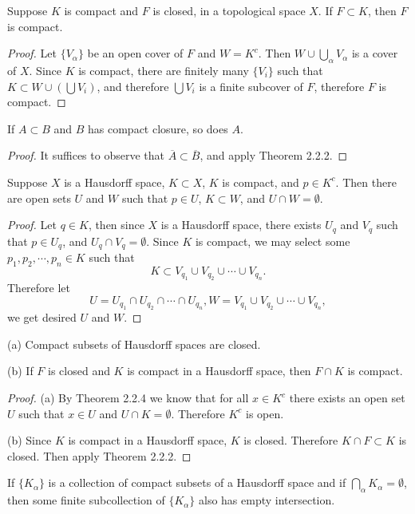 \begin{theorem}
Suppose $K$ is compact and $F$ is closed, in a topological space $X$. If $F\subset K$, then $F$ is compact.
\end{theorem}
\begin{proof}
Let $\{V_\alpha\}$ be an open cover of $F$ and $W=K^c$. Then $W\cup\bigcup_{\alpha}V_\alpha$ is a cover of $X$. Since $K$ is compact, there are finitely many $\{V_i\}$ such that $K\subset W\cup \left( \bigcup{V_i} \right) $, and therefore $\bigcup V_i$ is a finite subcover of $F$, therefore $F$ is compact.
\end{proof}
\begin{corollary}
If $A\subset B$ and $B$ has compact closure, so does $A$.
\end{corollary}
\begin{proof}
It suffices to observe that $\overline{A}\subset\overline{B}$, and apply Theorem 2.2.2.
\end{proof}
\begin{theorem}
Suppose $X$ is a Hausdorff space, $K\subset X$, $K$ is compact, and $p\in K^c$. Then there are open sets $U$ and $W$ such that $p\in U$, $K\subset W$, and $U\cap W=\emptyset$.
\end{theorem}
\begin{proof}
Let $q\in K$, then since $X$ is a Hausdorff space, there exists $U_q$ and $V_q$ such that $p\in U_q$, and $U_q\cap V_q=\emptyset$. Since $K$ is compact, we may select some $p_1,p_2,\cdots,p_n\in K$ such that 
$$K\subset V_{q_1}\cup V_{q_2}\cup\cdots\cup V_{q_n}.$$
Therefore let 
$$U=U_{q_1}\cap U_{q_2}\cap\cdots\cap U_{q_n},W=V_{q_1}\cup V_{q_2}\cup\cdots\cup V_{q_n},$$
we get desired $U$ and $W$.
\end{proof}
\begin{corollary}
(a) Compact subsets of Hausdorff spaces are closed.\par
(b) If $F$ is closed and $K$ is compact in a Hausdorff space, then $F\cap K$ is compact.
\end{corollary}
\begin{proof}
(a) By Theorem 2.2.4 we know that for all $x\in K^c$ there exists an open set $U$ such that $x\in U$ and $U\cap K=\emptyset$. Therefore $K^c$ is open.\par
(b) Since $K$ is compact in a Hausdorff space, $K$ is closed. Therefore $K\cap F\subset K$ is closed. Then apply Theorem 2.2.2.
\end{proof}
\begin{theorem}
If $\{K_\alpha\}$ is a collection of compact subsets of a Hausdorff space and if $\bigcap_\alpha K_\alpha=\emptyset$, then some finite subcollection of $\{K_\alpha\}$ also has empty intersection.
\end{theorem}
